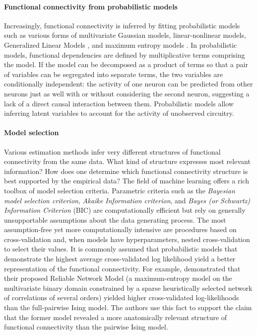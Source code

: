 \documentclass[10pt]{article}
\begin{document}
\paragraph{Functional connectivity from probabilistic models}
Increasingly, functional connectivity is inferred by fitting probabilistic models such as various forms of multivariate Gaussian models, linear-nonlinear models, Generalized Linear Models \cite{Pillow:2008}, and maximum entropy models \cite{Schneidman:2006, Tkacik:2006, Tang:2008, Shlens:2009}. In probabilistic models, functional dependencies are defined by multiplicative terms comprising the model. If the model can be decomposed as a product of terms so that a pair of variables can be segregated into separate terms, the two variables are conditionally independent: the activity of one neuron can be predicted from other neurons just as well with or without considering the second neuron, suggesting a lack of a direct causal interaction between them. Probabilistic models allow inferring latent variables to account for the activity of unobserved circuitry.


\paragraph{Model selection}
Various estimation methods infer very different structures of functional connectivity from the same data. What kind of structure expresses most relevant information? How does one determine which functional connectivity structure is best supported by the empirical data? The field of machine learning offers a rich toolbox of model selection criteria. Parametric criteria such as the \emph{Bayesian model selection criterion}, \emph{Akaike Information criterion}, and \emph{Bayes (or Schwartz) Information Criterion} (BIC) are computationally efficient but rely on generally unsupportable assumptions about the data generating process.  The most assumption-free yet more computationally intensive are procedures based on cross-validation \cite{Arlot:2010} and, when models have hyperparameters, nested cross-validation to select their values. It is commonly assumed that probabilistic models that demonstrate the highest average cross-validated log likelihood yield a better representation of the functional connectivity. For example, \cite{Ganmor:2011} demonstrated that their proposed Reliable Network Model (a maximum-entropy model on the multivariate binary domain constrained by a sparse heuristically selected network of correlations of several orders) yielded higher cross-validated log-likelihoods than the full-pairwise Ising model. The authors use this fact to support the claim that the former model revealed a more anatomically relevant structure of functional connectivity than the pairwise Ising model.
\end{document}
